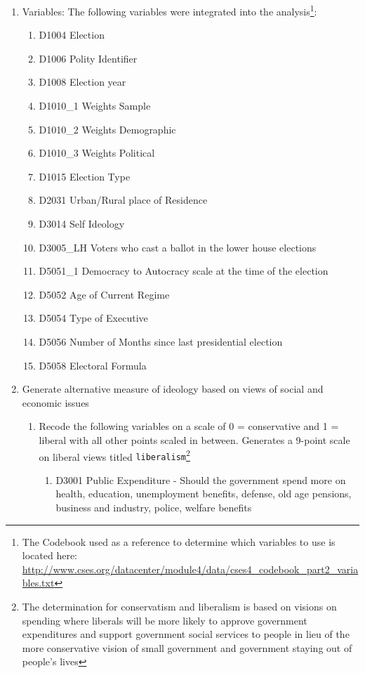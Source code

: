 \documentclass[12pt]{article}
\newcommand\txt{\texttt}
\begin{document}
\begin{enumerate}
\item Variables: The following variables were integrated into the analysis\footnote{The Codebook used as a reference to determine which variables to use is located here: \url{http://www.cses.org/datacenter/module4/data/cses4_codebook_part2_variables.txt}}:
\begin{enumerate}
	\item D1004 Election
	\item D1006 Polity Identifier
	\item D1008 Election year
	\item D1010\_1 Weights Sample
	\item D1010\_2 Weights Demographic
	\item D1010\_3 Weights Political 
	\item D1015 Election Type
	\item D2031 Urban/Rural place of Residence
	\item D3014 Self Ideology
	\item D3005\_LH Voters who cast a ballot in the lower house elections
	\item D5051\_1 Democracy to Autocracy scale at the time of the election
	\item D5052 Age of Current Regime
	\item D5054 Type of Executive
	\item D5056 Number of Months since last presidential election
	\item D5058 Electoral Formula
\end{enumerate} 
\item Generate alternative measure of ideology based on views of social and economic issues
\begin{enumerate}
	\item Recode the following variables on a scale of 0 = conservative and 1 = liberal with all other points scaled in between. Generates a 9-point scale on liberal views titled {\txt{liberalism}}\footnote{The determination for conservatism and liberalism is based on visions on spending where liberals will be more likely to approve government expenditures and support government social services to people in lieu of the more conservative vision of small government and government staying out of people's lives}
	\begin{enumerate}
		\item D3001 Public Expenditure - Should the government spend more on health, education, unemployment benefits, defense, old age pensions, business and industry, police, welfare benefits

\end{enumerate}
\end{enumerate}
\end{enumerate}
\end{document}
